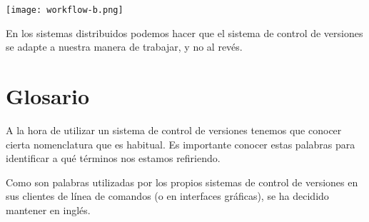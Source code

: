 \begin{center}
    \texttt{[image: workflow-b.png]}
\end{center}

En los sistemas distribuidos podemos hacer que el sistema de control de versiones se adapte a nuestra manera de trabajar, y no al revés.

\chapter{Glosario}
A la hora de utilizar un sistema de control de versiones tenemos que conocer cierta nomenclatura que es habitual. Es importante conocer estas palabras para identificar a qué términos nos estamos refiriendo.

Como son palabras utilizadas por los propios sistemas de control de versiones en sus clientes de línea de comandos (o en interfaces gráficas), se ha decidido mantener en inglés.



